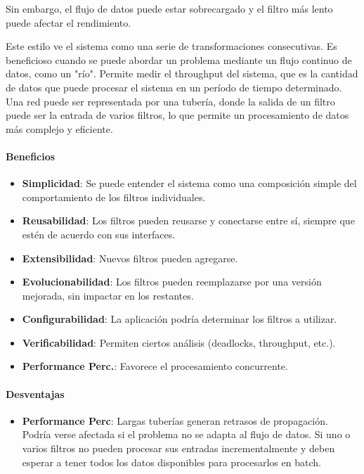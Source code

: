 \documentclass{article}
\begin{document}
			Sin embargo, el flujo de datos puede estar sobrecargado y el filtro más lento puede afectar el rendimiento.
			
			Este estilo ve el sistema como una serie de transformaciones consecutivas. Es beneficioso cuando se puede abordar un problema mediante un flujo continuo de datos, como un "río". Permite medir el throughput del sistema, que es la cantidad de datos que puede procesar el sistema en un período de tiempo determinado. Una red puede ser representada por una tubería, donde la salida de un filtro puede ser la entrada de varios filtros, lo que permite un procesamiento de datos más complejo y eficiente.
			\paragraph{Beneficios}
				\begin{itemize}	
					\item {\textbf{Simplicidad}}: Se puede entender el sistema como una composición
					simple del comportamiento de los filtros individuales.
					\item {\textbf{Reusabilidad}}: Los filtros pueden reusarse y conectarse entre sí,
					siempre que estén de acuerdo con sus interfaces.
					\item {\textbf{Extensibilidad}}: Nuevos filtros pueden agregarse.
					\item {\textbf{Evolucionabilidad}}: Los filtros pueden reemplazarse por una versión
					mejorada, sin impactar en los restantes.
					\item {\textbf{Configurabilidad}}: La aplicación podría determinar los filtros a utilizar.
					\item {\textbf{Verificabilidad}}: Permiten ciertos análisis (deadlocks, throughput, etc.).
					\item {\textbf{Performance Perc.}}: Favorece el procesamiento concurrente.
				\end{itemize}
			
			\paragraph{Desventajas}
				\begin{itemize}	
					
					\item {\textbf{Performance Perc}}: Largas tuberías generan retrasos de propagación. Podría verse afectada si el problema no se adapta al flujo de datos. Si uno o varios filtros no pueden procesar sus entradas incrementalmente y deben esperar a tener todos los datos disponibles para procesarlos en batch.
					
				\end{itemize}
			
\end{document}
